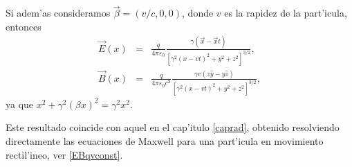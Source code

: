 Si adem'as consideramos $\vec{\beta}=({v}/{c},0,0)$, donde $v$ es
la rapidez de la part'icula, entonces
\begin{eqnarray}
\vec{E}(x)&=&\frac{q}{4\pi\varepsilon_0}\frac{\gamma (\vec{x}-\vec{x}t)}{\left[\gamma^2 (x-vt)^2+y^2+z^2\right]^{3/2}} ,
\label{Evx}\\
\vec{B}(x)&=&\frac{q}{4\pi\varepsilon_0c^2}\frac{\gamma v \left(z\hat{y}-y\hat{z}\right)}{\left[\gamma^2 (x-vt)^2+y^2+z^2\right]^{3/2}}, \label{Bvx}
\end{eqnarray}
ya que $ x^2+\gamma^2(\beta x)^2=\gamma^2x^2$.

Este resultado coincide con aquel en el cap'itulo \ref{caprad}, obtenido resolviendo directamente las ecuaciones de Maxwell para una part'icula en movimiento rectil'ineo, ver \eqref{EBqvconst}.

%
